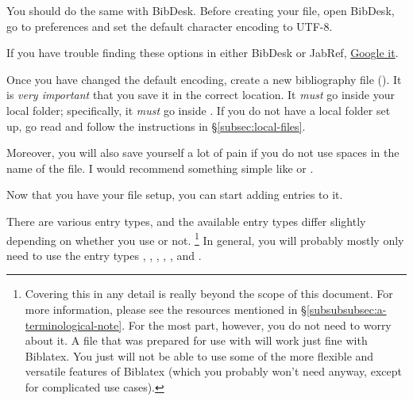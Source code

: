 You should do the same with BibDesk.
Before creating your  file, open BibDesk, go to preferences and set the default character encoding to UTF-8.

If you have trouble finding these options in either BibDesk or JabRef, \href{https://xkcd.com/627/}{Google it}. 

Once you have changed the default encoding, create a new bibliography file ().
It is \emph{very important} that you save it in the correct location.
It \emph{must} go inside your local  folder; specifically, it \emph{must} go inside .
If you do not have a local  folder set up, go read and follow the instructions in \S\ref{subsec:local-files}.

Moreover, you will also save yourself a lot of pain if you do not use spaces in the name of the file.
I would recommend something simple like  or .

Now that you have your  file setup, you can start adding entries to it.

\label{subsubsubsec:entry-types}

There are various entry types, and the available entry types differ slightly depending on whether you use  or not.%
\footnote{%
\label{fn:entry-types-biblatex-vs-bibtex}
Covering this in any detail is really beyond the scope of this document.
For more information, please see the resources mentioned in \S\ref{subsubsubsec:a-terminological-note}.
For the most part, however, you do not need to worry about it.
A  file that was prepared for use with  will work just fine with Biblatex.
You just will not be able to use some of the more flexible and versatile features of Biblatex (which you probably won't need anyway, except for complicated use cases).%
}
In general, you will probably mostly only need to use the entry types , , , , , and .

